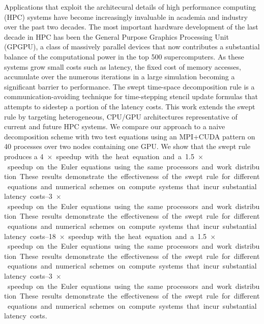 
Applications that exploit the architecural details of high performance computing (HPC) systems have become increasingly invaluable in academia and industry over the past two decades.
The most important hardware development of the last decade in HPC has been the General Purpose Graphics Processing Unit (GPGPU), a class of massively parallel devices that now contributes a substantial balance of the computational power in the top 500 supercomputers.
As these systems grow small costs such as latency, the fixed cost of memory accesses, accumulate over the numerous iterations in a large simulation becoming a significant barrier to performance. 
The swept time-space decomposition rule is a communication-avoiding technique for time-stepping stencil update formulas that attempts to sidestep a portion of the latency costs.
This work extends the swept rule by targeting heterogeneous, CPU\slash GPU architectures representative of current and future HPC systems.
We compare our approach to a naive decomposition scheme with two test equations using an MPI+CUDA pattern on 40 processes over two nodes containing one GPU.
We show that the swept rule produces a \SIrange{4}{18}{$\times$} speedup with the heat equation and a \SIrange{1.5}{3}{$\times$} speedup on the Euler equations using the same processors and work distribution.
These results demonstrate the effectiveness of the swept rule for different equations and numerical schemes on compute systems that incur substantial latency costs.
